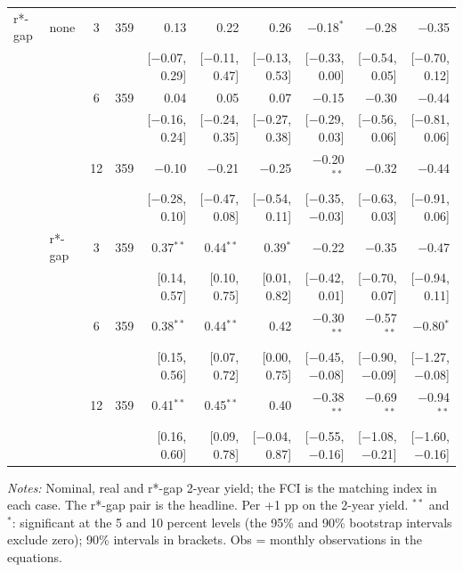 \begin{longtable}{llcrrrrrrr}
\addlinespace
r*-gap & none & 3 & 359 & 0.13 & 0.22 & 0.26 & $-$0.18$^{*}$ & $-$0.28 & $-$0.35\\
 & & & & {\scriptsize [$-$0.07, 0.29]} & {\scriptsize [$-$0.11, 0.47]} & {\scriptsize [$-$0.13, 0.53]} & {\scriptsize [$-$0.33, 0.00]} & {\scriptsize [$-$0.54, 0.05]} & {\scriptsize [$-$0.70, 0.12]}\\
 &  & 6 & 359 & 0.04 & 0.05 & 0.07 & $-$0.15 & $-$0.30 & $-$0.44\\
 & & & & {\scriptsize [$-$0.16, 0.24]} & {\scriptsize [$-$0.24, 0.35]} & {\scriptsize [$-$0.27, 0.38]} & {\scriptsize [$-$0.29, 0.03]} & {\scriptsize [$-$0.56, 0.06]} & {\scriptsize [$-$0.81, 0.06]}\\
 &  & 12 & 359 & $-$0.10 & $-$0.21 & $-$0.25 & $-$0.20$^{**}$ & $-$0.32 & $-$0.44\\
 & & & & {\scriptsize [$-$0.28, 0.10]} & {\scriptsize [$-$0.47, 0.08]} & {\scriptsize [$-$0.54, 0.11]} & {\scriptsize [$-$0.35, $-$0.03]} & {\scriptsize [$-$0.63, 0.03]} & {\scriptsize [$-$0.91, 0.06]}\\
 & r*-gap & 3 & 359 & 0.37$^{**}$ & 0.44$^{**}$ & 0.39$^{*}$ & $-$0.22 & $-$0.35 & $-$0.47\\
 & & & & {\scriptsize [0.14, 0.57]} & {\scriptsize [0.10, 0.75]} & {\scriptsize [0.01, 0.82]} & {\scriptsize [$-$0.42, 0.01]} & {\scriptsize [$-$0.70, 0.07]} & {\scriptsize [$-$0.94, 0.11]}\\
 &  & 6 & 359 & 0.38$^{**}$ & 0.44$^{**}$ & 0.42 & $-$0.30$^{**}$ & $-$0.57$^{**}$ & $-$0.80$^{*}$\\
 & & & & {\scriptsize [0.15, 0.56]} & {\scriptsize [0.07, 0.72]} & {\scriptsize [0.00, 0.75]} & {\scriptsize [$-$0.45, $-$0.08]} & {\scriptsize [$-$0.90, $-$0.09]} & {\scriptsize [$-$1.27, $-$0.08]}\\
 &  & 12 & 359 & 0.41$^{**}$ & 0.45$^{**}$ & 0.40 & $-$0.38$^{**}$ & $-$0.69$^{**}$ & $-$0.94$^{**}$\\
 & & & & {\scriptsize [0.16, 0.60]} & {\scriptsize [0.09, 0.78]} & {\scriptsize [$-$0.04, 0.87]} & {\scriptsize [$-$0.55, $-$0.16]} & {\scriptsize [$-$1.08, $-$0.21]} & {\scriptsize [$-$1.60, $-$0.16]}\\
\end{longtable}
\begin{flushleft}\footnotesize\textit{Notes:} Nominal, real and r*-gap 2-year yield; the FCI is the matching index in each case. The r*-gap pair is the headline. Per +1 pp on the 2-year yield. $^{**}$ and $^{*}$: significant at the 5 and 10 percent levels (the 95\% and 90\% bootstrap intervals exclude zero); 90\% intervals in brackets. Obs = monthly observations in the equations.\end{flushleft}
\endgroup
